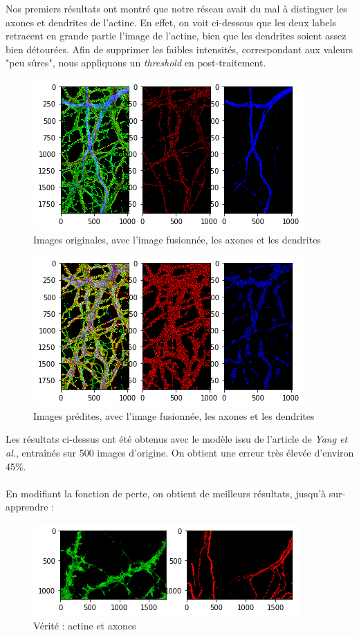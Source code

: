 \documentclass{report}
\begin{document}
Nos premiers résultats ont montré que notre réseau avait du mal à distinguer
les axones et dendrites de l'actine. En effet, on voit ci-dessous que les deux labels
retracent en grande partie l'image de l'actine, bien que les dendrites soient assez
bien détourées. Afin de supprimer les faibles intensités, correspondant aux valeurs
"peu sûres", nous appliquons un \textit{threshold} en post-traitement.

\begin{figure}[H]
\centering
\includegraphics[scale=0.5]{"truth"}
\caption{Images originales, avec l'image fusionnée, les axones et les dendrites}
\end{figure}

\begin{figure}[H]
\centering
\includegraphics[scale=0.5]{"result"}
\caption{Images prédites, avec l'image fusionnée, les axones et les dendrites}
\end{figure}

Les résultats ci-dessus ont été obtenus avec le modèle issu de l'article de
\textit{Yang et al.}, entraînés sur 500 images d'origine. On obtient une erreur
très élevée d'environ 45\%. \\ \\
En modifiant la fonction de perte, on obtient de meilleurs résultats, jusqu'à
sur-apprendre :

\begin{figure}[H]
\centering
\includegraphics[scale=0.5]{"result_overfit_truth"}
\caption{Vérité : actine et axones}
\end{figure}
\end{document}
